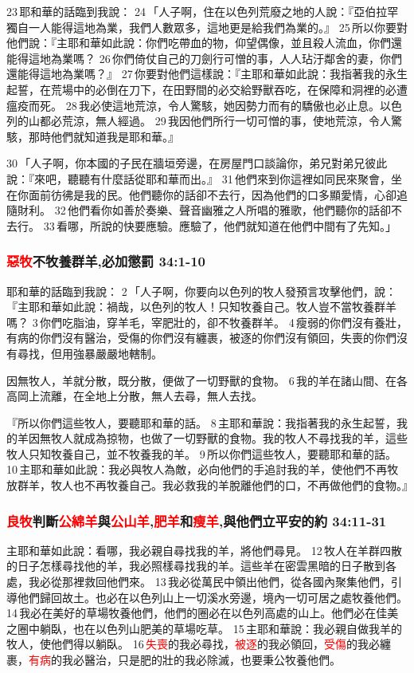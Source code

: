 23 耶和華的話臨到我說： 24 「人子啊，住在以色列荒廢之地的人說：『亞伯拉罕獨自一人能得這地為業，我們人數眾多，這地更是給我們為業的。』 25 所以你要對他們說：『主耶和華如此說：你們吃帶血的物，仰望偶像，並且殺人流血，你們還能得這地為業嗎？ 26 你們倚仗自己的刀劍行可憎的事，人人玷汙鄰舍的妻，你們還能得這地為業嗎？』 27 你要對他們這樣說：『主耶和華如此說：我指著我的永生起誓，在荒場中的必倒在刀下，在田野間的必交給野獸吞吃，在保障和洞裡的必遭瘟疫而死。 28 我必使這地荒涼，令人驚駭，她因勢力而有的驕傲也必止息。以色列的山都必荒涼，無人經過。 29 我因他們所行一切可憎的事，使地荒涼，令人驚駭，那時他們就知道我是耶和華。』

30 「人子啊，你本國的子民在牆垣旁邊，在房屋門口談論你，弟兄對弟兄彼此說：『來吧，聽聽有什麼話從耶和華而出。』 31 他們來到你這裡如同民來聚會，坐在你面前彷彿是我的民。他們聽你的話卻不去行，因為他們的口多顯愛情，心卻追隨財利。 32 他們看你如善於奏樂、聲音幽雅之人所唱的雅歌，他們聽你的話卻不去行。 33 看哪，所說的快要應驗。應驗了，他們就知道在他們中間有了先知。」
  
\subsubsection{\textcolor{red}{惡牧}不牧養群羊,必加懲罰 34:1-10}
耶和華的話臨到我說： 2 「人子啊，你要向以色列的牧人發預言攻擊他們，說：『主耶和華如此說：禍哉，以色列的牧人！只知牧養自己。牧人豈不當牧養群羊嗎？ 3 你們吃脂油，穿羊毛，宰肥壯的，卻不牧養群羊。 4 瘦弱的你們沒有養壯，有病的你們沒有醫治，受傷的你們沒有纏裹，被逐的你們沒有領回，失喪的你們沒有尋找，但用強暴嚴嚴地轄制。 

因無牧人，羊就分散，既分散，便做了一切野獸的食物。 6 我的羊在諸山間、在各高岡上流離，在全地上分散，無人去尋，無人去找。


『所以你們這些牧人，要聽耶和華的話。 8 主耶和華說：我指著我的永生起誓，我的羊因無牧人就成為掠物，也做了一切野獸的食物。我的牧人不尋找我的羊，這些牧人只知牧養自己，並不牧養我的羊。 9 所以你們這些牧人，要聽耶和華的話。 10 主耶和華如此說：我必與牧人為敵，必向他們的手追討我的羊，使他們不再牧放群羊，牧人也不再牧養自己。我必救我的羊脫離他們的口，不再做他們的食物。』

\subsubsection{\textcolor{red}{良牧}判斷\textcolor{red}{公綿羊}與\textcolor{red}{公山羊},\textcolor{red}{肥羊}和\textcolor{red}{瘦羊},與他們立平安的約 34:11-31}
主耶和華如此說：看哪，我必親自尋找我的羊，將他們尋見。 12 牧人在羊群四散的日子怎樣尋找他的羊，我必照樣尋找我的羊。這些羊在密雲黑暗的日子散到各處，我必從那裡救回他們來。 13 我必從萬民中領出他們，從各國內聚集他們，引導他們歸回故土。也必在以色列山上一切溪水旁邊，境內一切可居之處牧養他們。 14 我必在美好的草場牧養他們，他們的圈必在以色列高處的山上。他們必在佳美之圈中躺臥，也在以色列山肥美的草場吃草。 15 主耶和華說：我必親自做我羊的牧人，使他們得以躺臥。 16 \textcolor{red}{失喪}的我必尋找，\textcolor{red}{被逐}的我必領回，\textcolor{red}{受傷}的我必纏裹，\textcolor{red}{有病}的我必醫治，只是肥的壯的我必除滅，也要秉公牧養他們。

